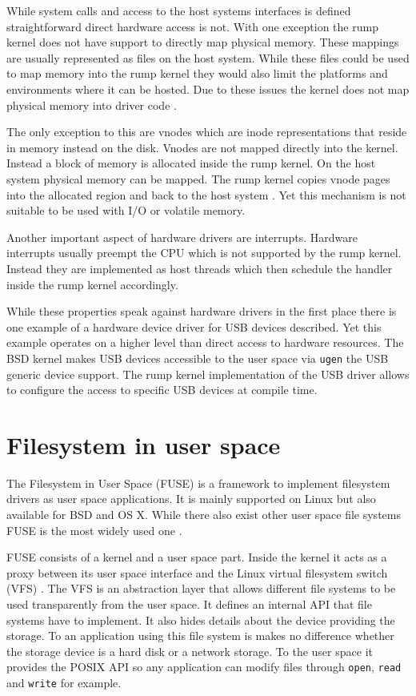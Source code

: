 \documentclass[
a4paper,
12pt,
notitlepage,
parskip=half,
DIV=11,
]{scrbook}
\begin{document}
		While system calls and access to the host systems interfaces is defined straightforward direct hardware access is not.
		With one exception the rump kernel does not have support to directly map physical memory.
		These mappings are usually represented as files on the host system.
		While these files could be used to map memory into the rump kernel they would also limit the platforms and environments where it can be hosted.
		Due to these issues the kernel does not map physical memory into driver code \citep{kantee}.
		
		The only exception to this are vnodes which are inode representations that reside in memory instead on the disk.
		Vnodes are not mapped directly into the kernel.
		Instead a block of memory is allocated inside the rump kernel.
		On the host system physical memory can be mapped.
		The rump kernel copies vnode pages into the allocated region and back to the host system \citep{kantee}.
		Yet this mechanism is not suitable to be used with I/O or volatile memory.
		
		Another important aspect of hardware drivers are interrupts.
		Hardware interrupts usually preempt the CPU which is not supported by the rump kernel.
		Instead they are implemented as host threads which then schedule the handler inside the rump kernel accordingly. \citep{kantee}
		
		While these properties speak against hardware drivers in the first place there is one example of a hardware device driver for USB devices described.
		Yet this example operates on a higher level than direct access to hardware resources.
		The BSD kernel makes USB devices accessible to the user space via \texttt{ugen} the USB generic device support.
		The rump kernel implementation of the USB driver allows to configure the access to specific USB devices at compile time. \citep{kantee} \citep{ugen}
		
		\section{Filesystem in user space}
		
		The Filesystem in User Space (FUSE) \citep{fuse} is a framework to implement filesystem drivers as user space applications.
		It is mainly supported on Linux but also available for BSD and OS X.
		While there also exist other user space file systems FUSE is the most widely used one \citep{202324}.
	
		FUSE consists of a kernel and a user space part.
		Inside the kernel it acts as a proxy between its user space interface and the Linux virtual filesystem switch (VFS) \citep{202324}.
		The VFS is an abstraction layer that allows different file systems to be used transparently from the user space.
		It defines an internal API that file systems have to implement.
		It also hides details about the device providing the storage.
		To an application using this file system is makes no difference whether the storage device is a hard disk or a network storage.
		To the user space it provides the POSIX API so any application can modify files through \texttt{open}, \texttt{read} and \texttt{write} for example. \citep{ibmvfs}
		
\end{document}
